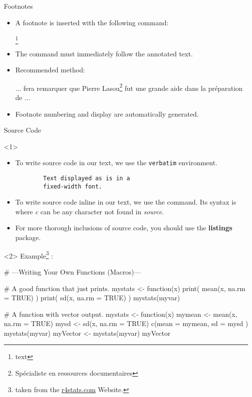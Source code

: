 \begin{frame}[fragile,c]{Footnotes}
	\begin{itemize}
		\item A footnote is inserted with the following command:
\begin{codesource}
	\footnote{text}
\end{codesource}
		\item The command must immediately follow the annotated text.
		\item Recommended method:
\begin{codesource}
	... fera remarquer que Pierre Lasou\footnote{%
	Spécialiste en ressources documentaires} %
	fut une grande aide dans la préparation de ...
\end{codesource}
		\item Footnote numbering and display are automatically generated.
	\end{itemize}
\end{frame}

\begin{frame}[fragile,c]{Source Code}
	\begin{onlyenv}
		\begin{itemize}
			\item To write source code in our text, we use the \texttt{verbatim} environment.
\begin{codesource}
	\begin{verbatim}
		Text displayed as is in a
		fixed-width font.
	\end{verbatim}
\end{codesource}
			\item To write source code inline in our text, we use the  command. Its syntax is  where \emph{c} can be any character not found in \emph{source}.
			\item For more thorough inclusions of source code, you should use the \textbf{listings} package.
		\end{itemize}
	\end{onlyenv}

	\begin{onlyenv}
	Example\footnote{taken from the \href{http://r4stats.com/examples/programming/}{r4stats.com} Website.} :
\begin{codesource}
	# ---Writing Your Own Functions (Macros)---
	
	# A good function that just prints.
	mystats <- function(x) {
		print( mean(x, na.rm = TRUE) )
		print(   sd(x, na.rm = TRUE) )
	}
	mystats(myvar)
	
	# A function with vector output.
	mystats  <- function(x) {
		mymean <- mean(x, na.rm = TRUE)
		mysd   <-   sd(x, na.rm = TRUE)
		c(mean = mymean, sd = mysd )
	}
	mystats(myvar)
	myVector <- mystats(myvar)
	myVector
\end{codesource}
	\end{onlyenv}
\end{frame}